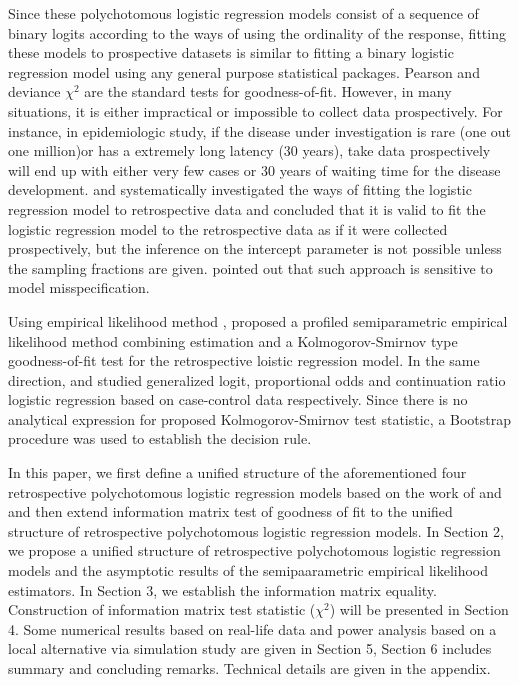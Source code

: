 \documentclass[11pt]{article}
\theoremstyle{plain}
\theoremstyle{definition}
\theoremstyle{remark}
\theoremstyle{definition}
\begin{document}
Since these polychotomous logistic regression models consist of a sequence of binary logits according to the ways of using the ordinality of the response, fitting these models to prospective datasets is similar to fitting a binary logistic regression model using any general purpose statistical packages. Pearson and deviance $\chi^2$ are the standard tests for goodness-of-fit. However, in many situations, it is either impractical or impossible to collect data prospectively. For instance, in epidemiologic study, if the disease under investigation is rare (one out one million)or has a extremely long latency (30 years), take data prospectively will end up with either very few cases or 30 years of waiting time for the disease development. \cite{Farewell-LogisticRetrospective-Biometrika-1979} and \cite{Prentice-Pyke-LogisticCasecontrol-Biometrika-1979} systematically investigated the ways of fitting the logistic regression model to retrospective data and concluded that it is valid to fit the logistic regression model to the retrospective data as if it were collected prospectively, but the inference on the intercept parameter is not possible unless the sampling fractions are given. \cite{Scott-Wild-CaseControl-ChoiceBasedSampling-JRSSSB-1986} pointed out that such approach is sensitive to model misspecification.

Using empirical likelihood method \citep{Owen-Biometrika-1988,Owen-Ann-1990}, \cite{Qin-Zhang-Biometrika-1997} proposed a profiled semiparametric empirical likelihood method combining estimation and a Kolmogorov-Smirnov type goodness-of-fit test for the retrospective loistic regression model. In the same direction, \cite{ZhangBiao-JMA-2002,ZhangBiao-AustrNZJS-2004} and \cite{Peng-Zhang-JSPI-2008} studied generalized logit, proportional odds and continuation ratio logistic regression based on case-control data respectively. Since there is no analytical expression for proposed Kolmogorov-Smirnov test statistic, a Bootstrap procedure was used to establish the decision rule.

In this paper, we first define a unified structure of the aforementioned four retrospective polychotomous logistic regression models based on the work of \cite{ZhangBiao-JMA-2002,ZhangBiao-AustrNZJS-2004} and \cite{Peng-Zhang-JSPI-2008} and then extend \cite{ZhangBiao-Biometrika-2001} information matrix test of goodness of fit to the unified structure of retrospective polychotomous logistic regression models. In Section 2, we propose a unified structure of retrospective polychotomous logistic regression models and the asymptotic results of the semipaarametric empirical likelihood estimators. In Section 3, we establish the information matrix equality. Construction of information matrix test statistic ($\chi^2$) will be presented in Section 4. Some numerical results based on real-life data and power analysis based on a local alternative via simulation study are given in Section 5, Section 6 includes summary and concluding remarks. Technical details are given in the appendix.
\end{document}
